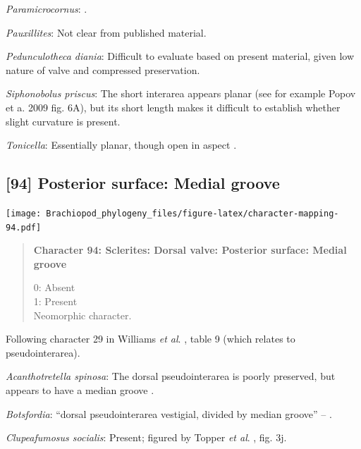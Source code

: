 \documentclass[openany]{book}
\begin{document}
\hypertarget{Paramicrocornus-coding-93}{}
\emph{Paramicrocornus}: \citet{Zhang2018Ahyolithid}.

\hypertarget{Pauxillites-coding-93}{}
\emph{Pauxillites}: Not clear from published material.

\hypertarget{Pedunculotheca_diania-coding-93}{}
\emph{Pedunculotheca diania}: Difficult to evaluate based on present
material, given low nature of valve and compressed preservation.

\hypertarget{Siphonobolus_priscus-coding-93}{}
\emph{Siphonobolus priscus}: The short interarea appears planar (see for
example Popov et a. 2009 fig. 6A), but its short length makes it
difficult to establish whether slight curvature is present.

\hypertarget{Tonicella-coding-93}{}
\emph{Tonicella}: Essentially planar, though open in aspect
\citep[following Chiton in][]{Schwabe2010}.

\subsection*{{[}94{]} Posterior surface: Medial
groove}\label{posterior-surface-medial-groove}

\texttt{[image: Brachiopod\_phylogeny\_files/figure-latex/character-mapping-94.pdf]}

\begin{quote}
\textbf{Character 94: Sclerites: Dorsal valve: Posterior surface: Medial
groove}

0: Absent\\
1: Present\\
Neomorphic character.
\end{quote}

Following character 29 in Williams \emph{et al}.
\citeyearpar{Williams2000LinguliformeaCraniiformea}, table 9 (which
relates to pseudointerarea).

\hypertarget{Acanthotretella_spinosa-coding-94}{}
\emph{Acanthotretella spinosa}: The dorsal pseudointerarea is poorly
preserved, but appears to have a median groove
\citep{Holmer2006Aspinose}.

\hypertarget{Botsfordia-coding-94}{}
\emph{Botsfordia}: ``dorsal pseudointerarea vestigial, divided by median
groove'' -- \citet{Williams2000LinguliformeaCraniiformea}.

\hypertarget{Clupeafumosus_socialis-coding-94}{}
\emph{Clupeafumosus socialis}: Present; figured by Topper \emph{et al}.
\citeyearpar{Topper2013Reappraisalof}, fig. 3j.
\end{document}
